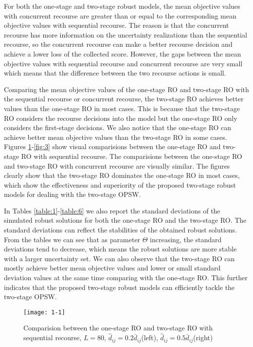 \documentclass[preprint,review,10pt,round,authoryear]{elsarticle}\usepackage[]{graphicx}\usepackage[]{color}
\makeatletter
\def\maxwidth{ %
  \ifdim\Gin@nat@width>\linewidth
    \linewidth
  \else
    \Gin@nat@width
  \fi
}
\newenvironment{knitrout}{}{} %
\theoremstyle{plain}
\theoremstyle{definition}
\theoremstyle{remark}
\makeatother
\begin{document}
For both the one-stage and two-stage robust models, the mean objective values with concurrent recourse are greater than or equal to the corresponding mean objective values with sequential recourse. The reason is that the concurrent recourse has more information on the uncertainty realizations than the sequential recourse, so the concurrent recourse can make a better recourse decision and achieve a lower loss of the collected score. However, the gaps between the mean objective values with sequential recourse and concurrent recourse are very small which means that the difference between the two recourse actions is small. 

Comparing the mean objective values of the one-stage RO and two-stage RO with the sequential recourse or concurrent recourse, the two-stage RO achieves better values than the one-stage RO in most cases. This is because that the two-stage RO considers the recourse decisions into the model but the one-stage RO only considers the first-stage decisions. We also notice that the one-stage RO can achieve better mean objective values than the two-stage RO in some cases. Figures \ref{fig:1}-\ref{fig:3} show visual comparisions between the one-stage RO and two-stage RO with sequential recourse. The comparisions between the one-stage RO and two-stage RO with concurrent recourse are visually similar. The figures clearly show that the two-stage RO dominates the one-stage RO in most cases, which show the effectiveness and superiority of the proposed two-stage robust models for dealing with the two-stage OPSW.

In Tables \ref{table:1}-\ref{table:6} we also report the standard deviations of the simulated robust solutions for both the one-stage RO and the two-stage RO. The standard deviations can reflect the stabilities of the obtained robust solutions. From the tables we can see that as parameter $\Theta$ increasing, the standard deviations tend to decrease, which means the robust solutions are more stable with a larger uncertainty set. We can also observe that the two-stage RO can mostly achieve better mean objective values and lower or small standard deviation values at the same time comparing with the one-stage RO. This further indicates that the proposed two-stage robust models can efficiently tackle the two-stage OPSW.


\begin{knitrout}
\color{fgcolor}\begin{figure}[!h]

{\centering \texttt{[image: 1-1]} 

}

\caption{Comparision between the one-stage RO and two-stage RO with sequential recourse, $L=80$, $\hat{d}_{ij}= 0.2\bar{d}_{ij} $(left), $\hat{d}_{ij}= 0.5\bar{d}_{ij} $(right)}\label{fig:1}
\end{figure}


\end{knitrout}
\end{document}
